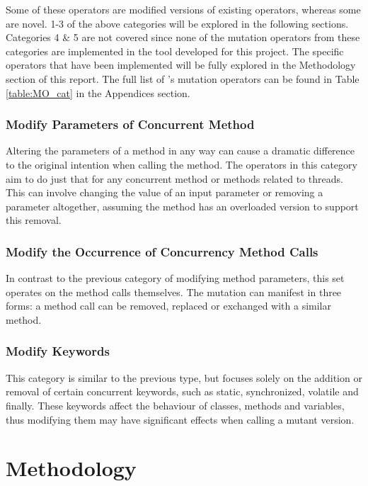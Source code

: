 \documentclass[a4paper,12pt]{article}
\begin{document}
Some of these operators are modified versions of existing operators, whereas some are novel. 1-3 of the above categories will be explored in the following sections. Categories 4 \& 5 are not covered since none of the mutation operators from these categories are implemented in the tool developed for this project. The specific operators that have been implemented will be fully explored in the Methodology section of this report. The full list of \citeauthor{bradbury06}'s mutation operators can be found in Table \ref{table:MO_cat} in the Appendices section.


\subsubsection{Modify Parameters of Concurrent Method} \label{section:Modify Parameters}

Altering the parameters of a method in any way can cause a dramatic difference to the original intention when calling the method. The operators in this category aim to do just that for any concurrent method or methods related to threads. This can involve changing the value of an input parameter or removing a parameter altogether, assuming the method has an overloaded version to support this removal.  


\subsubsection{Modify the Occurrence of Concurrency Method Calls} \label{section:Modify Method Calls}

In contrast to the previous category of modifying method parameters, this set operates on the method calls themselves. The mutation can manifest in three forms: a method call can be removed, replaced or exchanged with a similar method.   


\subsubsection{Modify Keywords} \label{section:Modify Keywords}

This category is similar to the previous type, but focuses solely on the addition or removal of certain concurrent keywords, such as static, synchronized, volatile and finally. These keywords affect the behaviour of classes, methods and variables, thus modifying them may have significant effects when calling a mutant version.


\newpage
\section{Methodology}
\end{document}
